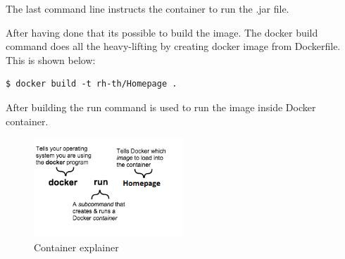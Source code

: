 The last command line instructs the container to run the .jar file. 

After having done that its possible to build the image. The docker build command does all the heavy-lifting by creating docker image from Dockerfile. This is shown below:

\begin{lstlisting}[frame=single]
	$ docker build -t rh-th/Homepage .
\end{lstlisting}

After building the run command is used to run the image inside Docker container. 



\begin{figure}[bht]
  \centering
      \includegraphics[width=0.5\textwidth]{gfx/container_explainer}
  \caption{Container explainer}
\end{figure}





 